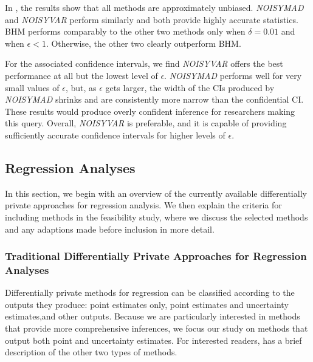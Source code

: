In \citet{barrientos2021}, the results show that all methods are approximately unbiased. \textit{NOISYMAD} and \textit{NOISYVAR} perform similarly and both provide highly accurate statistics. BHM performs comparably to the other two methods only when $\delta = 0.01$ and when $\epsilon < 1$. Otherwise, the other two clearly outperform BHM.

For the associated confidence intervals, we find \textit{NOISYVAR} offers the best performance at all but the lowest level of $\epsilon$. \textit{NOISYMAD} performs well for very small values of $\epsilon$, but, as $\epsilon$ gets larger, the width of the CIs produced by \textit{NOISYMAD} shrinks and are consistently more narrow than the confidential CI. These results would produce overly confident inference for researchers making this query. Overall, \textit{NOISYVAR} is preferable, and it is capable of providing sufficiently accurate confidence intervals for higher levels of $\epsilon$.

\subsection{Regression Analyses}
In this section, we begin with an overview of the currently available differentially private approaches for regression analysis. We then explain the criteria for including methods in the feasibility study, where we discuss the selected methods and any adaptions made before inclusion in more detail.

\subsubsection{Traditional Differentially Private Approaches for Regression Analyses}\label{subsubsec:reg_rev}

Differentially private methods for regression can be classified according to the outputs they produce: point estimates only, point estimates and uncertainty estimates,and other outputs. Because we are particularly interested in methods that provide more comprehensive inferences, we focus our study on methods that output both point and uncertainty estimates. For interested readers, \citet{barrientos2021} has a brief description of the other two types of methods.

